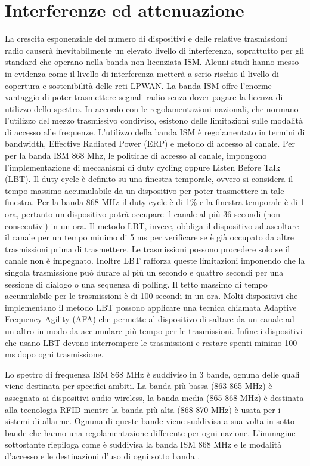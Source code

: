 \documentclass[12pt,a4paper,openright,twoside]{report}
\begin{document}
\section{Interferenze ed attenuazione}
La crescita esponenziale del numero di dispositivi e delle relative trasmissioni radio causer\`a inevitabilmente un elevato livello di interferenza, soprattutto per gli standard che operano nella banda non licenziata ISM. 
Alcuni studi hanno messo in evidenza come il livello di interferenza metter\`a a serio rischio il livello di copertura e sostenibilit\`a delle reti LPWAN.  
La banda ISM offre l'enorme vantaggio di poter trasmettere segnali radio senza dover pagare la licenza di utilizzo dello spettro. In accordo con le regolamentazioni nazionali, che normano l'utilizzo del mezzo trasmissivo condiviso, esistono delle limitazioni sulle modalit\`a di accesso alle frequenze.
L'utilizzo della banda ISM \`e regolamentato in termini di bandwidth, Effective Radiated Power (ERP) e metodo di accesso al canale. 
Per per la banda ISM 868 Mhz, le politiche di accesso al canale, impongono l'implementazione di meccanismi di duty cycling oppure Listen Before Talk (LBT). 
Il duty cycle \`e definito su una finestra temporale, ovvero si considera il tempo massimo accumulabile da un dispositivo per poter trasmettere in tale finestra. 
Per la banda 868 MHz il duty cycle \`e di 1\% e la finestra temporale \`e di 1 ora, pertanto un dispositivo potr\`a occupare il canale al pi\`u 36 secondi (non consecutivi) in un ora. 
Il metodo LBT, invece, obbliga il dispositivo ad ascoltare il canale per un tempo minimo di 5 ms per verificare se \`e gi\`a occupato da altre trasmissioni prima di trasmettere. 
Le trasmissioni possono procedere solo se il canale non \`e impegnato. Inoltre LBT rafforza queste limitazioni imponendo che la singola trasmissione pu\`o durare al pi\`u un secondo e quattro secondi per una sessione di dialogo o una sequenza di polling. 
Il tetto massimo di tempo accumulabile per le trasmissioni \`e di 100 secondi in un ora. 
Molti dispositivi che implementano il metodo LBT possono applicare una tecnica chiamata Adaptive Frequency Agility (AFA) che permette al dispositivo di saltare da un canale ad un altro in modo da accumulare pi\`u tempo per le trasmissioni. 
Infine i dispositivi che usano LBT devono interrompere le trasmissioni e restare spenti minimo 100 ms dopo ogni trasmissione.

Lo spettro di frequenza ISM 868 MHz \`e suddiviso in 3 bande, ognuna delle quali viene destinata per specifici ambiti. La banda pi\`u bassa (863-865 MHz) \`e assegnata ai dispositivi audio wireless, la banda media (865-868 MHz) \`e destinata alla tecnologia RFID mentre la banda pi\`u alta (868-870 MHz) \`e usata per i sistemi di allarme. Ognuna di queste bande viene suddivisa a sua volta in sotto bande che hanno una regolamentazione differente per ogni nazione. 
L'immagine sottostante riepiloga come \`e suddivisa la banda ISM 868 MHz e le modalit\`a d'accesso e le destinazioni d'uso di ogni sotto banda \cite{K15}.
\end{document}
